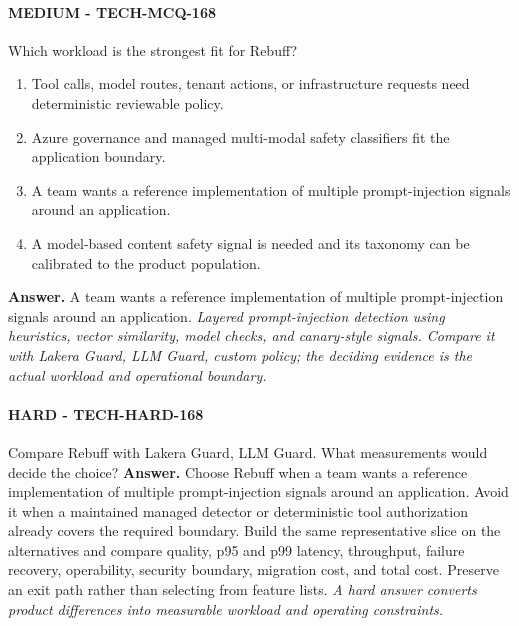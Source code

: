 \paragraph{MEDIUM - TECH-MCQ-168} Which workload is the strongest fit for Rebuff?
\begin{enumerate}[label=\Alph*.]
\item Tool calls, model routes, tenant actions, or infrastructure requests need deterministic reviewable policy.
\item Azure governance and managed multi-modal safety classifiers fit the application boundary.
\item A team wants a reference implementation of multiple prompt-injection signals around an application.
\item A model-based content safety signal is needed and its taxonomy can be calibrated to the product population.
\end{enumerate}
\textbf{Answer.} A team wants a reference implementation of multiple prompt-injection signals around an application.
\textit{Layered prompt-injection detection using heuristics, vector similarity, model checks, and canary-style signals. Compare it with Lakera Guard, LLM Guard, custom policy; the deciding evidence is the actual workload and operational boundary.}
\paragraph{HARD - TECH-HARD-168} Compare Rebuff with Lakera Guard, LLM Guard. What measurements would decide the choice?
\textbf{Answer.} Choose Rebuff when a team wants a reference implementation of multiple prompt-injection signals around an application. Avoid it when a maintained managed detector or deterministic tool authorization already covers the required boundary. Build the same representative slice on the alternatives and compare quality, p95 and p99 latency, throughput, failure recovery, operability, security boundary, migration cost, and total cost. Preserve an exit path rather than selecting from feature lists.
\textit{A hard answer converts product differences into measurable workload and operating constraints.}
